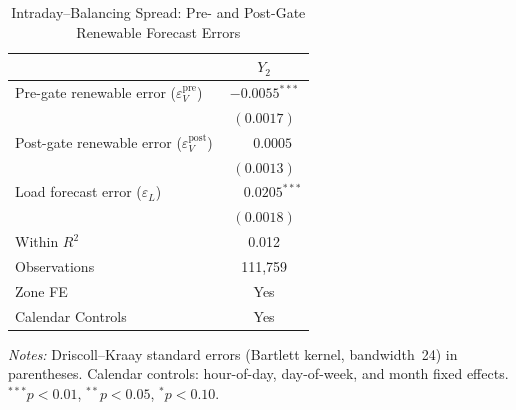 \begin{table}[htbp]
\centering
\caption{Intraday--Balancing Spread: Pre- and Post-Gate Renewable Forecast Errors}
\label{tab:4}
\begin{threeparttable}
\begin{tabularx}{\linewidth}{>{\raggedright\arraybackslash}Xc}
\toprule
 & $Y_2$ \\
\midrule
Pre-gate renewable error ($\varepsilon_V^{\mathrm{pre}}$) & $-0.0055^{***}$ \\
 & $(0.0017)$ \\[0.4ex]
Post-gate renewable error ($\varepsilon_V^{\mathrm{post}}$) & $\phantom{-}0.0005$ \\
 & $(0.0013)$ \\[0.4ex]
Load forecast error ($\varepsilon_L$) & $\phantom{-}0.0205^{***}$ \\
 & $(0.0018)$ \\
\midrule
Within $R^2$ & 0.012 \\
Observations & 111,759 \\
Zone FE & Yes \\
Calendar Controls & Yes \\
\bottomrule
\end{tabularx}
\begin{tablenotes}[flushleft]
\footnotesize
\item \textit{Notes:} Driscoll--Kraay standard errors (Bartlett kernel, bandwidth~24) in parentheses. Calendar controls: hour-of-day, day-of-week, and month fixed effects. $^{***}p<0.01$, $^{**}p<0.05$, $^{*}p<0.10$.
\end{tablenotes}
\end{threeparttable}
\end{table}

